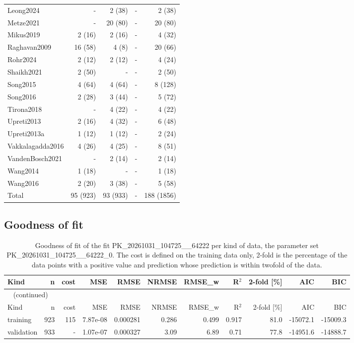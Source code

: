 \documentclass{article}
\begin{document}
\begin{longtable}{lrrrr}
Leong2024 & - & 2 (38) & - & 2 (38) \\
Metze2021 & - & 20 (80) & - & 20 (80) \\
Mikus2019 & 2 (16) & 2 (16) & - & 4 (32) \\
Raghavan2009 & 16 (58) & 4 (8) & - & 20 (66) \\
Rohr2024 & 2 (12) & 2 (12) & - & 4 (24) \\
Shaikh2021 & 2 (50) & - & - & 2 (50) \\
Song2015 & 4 (64) & 4 (64) & - & 8 (128) \\
Song2016 & 2 (28) & 3 (44) & - & 5 (72) \\
Tirona2018 & - & 4 (22) & - & 4 (22) \\
Upreti2013 & 2 (16) & 4 (32) & - & 6 (48) \\
Upreti2013a & 1 (12) & 1 (12) & - & 2 (24) \\
Vakkalagadda2016 & 4 (26) & 4 (25) & - & 8 (51) \\
VandenBosch2021 & - & 2 (14) & - & 2 (14) \\
Wang2014 & 1 (18) & - & - & 1 (18) \\
Wang2016 & 2 (20) & 3 (38) & - & 5 (58) \\
Total & 95 (923) & 93 (933) & - & 188 (1856) \\
\end{longtable}

\subsection{Goodness of fit}

\begin{longtable}{lrrrrrrrrrr}
\caption{Goodness of fit of the fit PK\_20261031\_104725\_\_64222 per kind of data, the parameter set PK\_20261031\_104725\_\_64222\_0. The cost is defined on the training data only, 2-fold is the percentage of the data points with a positive value and prediction whose prediction is within twofold of the data.}\label{tab:metrics:PK_20261031_104725__64222} \\
\toprule
Kind & n & cost & MSE & RMSE & NRMSE & RMSE\_w & R\ensuremath{^{2}} & 2-fold [\%] & AIC & BIC \\
\midrule
\endfirsthead
\multicolumn{11}{l}{\small\tablename~\thetable{} (continued)} \\
\toprule
Kind & n & cost & MSE & RMSE & NRMSE & RMSE\_w & R\ensuremath{^{2}} & 2-fold [\%] & AIC & BIC \\
\midrule
\endhead
\bottomrule
\endlastfoot
training & 923 & 115 & 7.87e-08 & 0.000281 & 0.286 & 0.499 & 0.917 & 81.0 & -15072.1 & -15009.3 \\
validation & 933 & - & 1.07e-07 & 0.000327 & 3.09 & 6.89 & 0.71 & 77.8 & -14951.6 & -14888.7 \\
\end{longtable}
\end{document}
